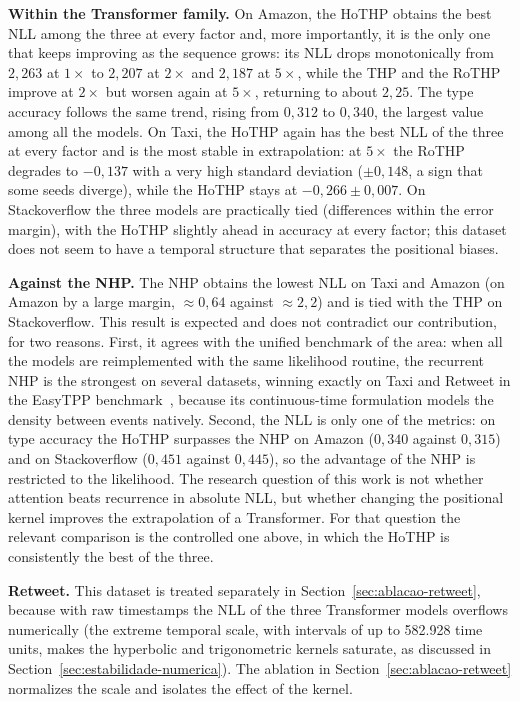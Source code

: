 \textbf{Within the Transformer family.} On Amazon, the HoTHP obtains the best NLL among the three at every factor and, more importantly, it is the only one that keeps improving as the sequence grows: its NLL drops monotonically from $2{,}263$ at $1\times$ to $2{,}207$ at $2\times$ and $2{,}187$ at $5\times$, while the THP and the RoTHP improve at $2\times$ but worsen again at $5\times$, returning to about $2{,}25$. The type accuracy follows the same trend, rising from $0{,}312$ to $0{,}340$, the largest value among all the models. On Taxi, the HoTHP again has the best NLL of the three at every factor and is the most stable in extrapolation: at $5\times$ the RoTHP degrades to $-0{,}137$ with a very high standard deviation ($\pm 0{,}148$, a sign that some seeds diverge), while the HoTHP stays at $-0{,}266 \pm 0{,}007$. On Stackoverflow the three models are practically tied (differences within the error margin), with the HoTHP slightly ahead in accuracy at every factor; this dataset does not seem to have a temporal structure that separates the positional biases.

\textbf{Against the NHP.} The NHP obtains the lowest NLL on Taxi and Amazon (on Amazon by a large margin, $\approx 0{,}64$ against $\approx 2{,}2$) and is tied with the THP on Stackoverflow. This result is expected and does not contradict our contribution, for two reasons. First, it agrees with the unified benchmark of the area: when all the models are reimplemented with the same likelihood routine, the recurrent NHP is the strongest on several datasets, winning exactly on Taxi and Retweet in the EasyTPP benchmark~\cite{xue_easytpp_2024}, because its continuous-time formulation models the density between events natively. Second, the NLL is only one of the metrics: on type accuracy the HoTHP surpasses the NHP on Amazon ($0{,}340$ against $0{,}315$) and on Stackoverflow ($0{,}451$ against $0{,}445$), so the advantage of the NHP is restricted to the likelihood. The research question of this work is not whether attention beats recurrence in absolute NLL, but whether changing the positional kernel improves the extrapolation of a Transformer. For that question the relevant comparison is the controlled one above, in which the HoTHP is consistently the best of the three.

\textbf{Retweet.} This dataset is treated separately in Section~\ref{sec:ablacao-retweet}, because with raw timestamps the NLL of the three Transformer models overflows numerically (the extreme temporal scale, with intervals of up to 582.928 time units, makes the hyperbolic and trigonometric kernels saturate, as discussed in Section~\ref{sec:estabilidade-numerica}). The ablation in Section~\ref{sec:ablacao-retweet} normalizes the scale and isolates the effect of the kernel.

